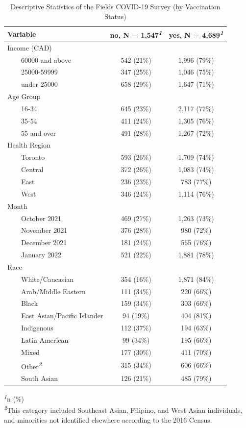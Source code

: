 \documentclass[
]{article}
\begin{document}
\hypertarget{tbl-descriptive-stats}{}
\setlength{\LTpost}{0mm}
\begin{longtable}{lcc}
\caption{\label{tbl-descriptive-stats}Descriptive Statistics of the Fields COVID-19 Survey (by Vaccination
Status) }\tabularnewline

\toprule
\textbf{Variable} & \textbf{no}, N = 1,547\textsuperscript{\textit{1}} & \textbf{yes}, N = 4,689\textsuperscript{\textit{1}} \\ 
\midrule
Income (CAD) &  &  \\ 
    60000 and above & 542 (21\%) & 1,996 (79\%) \\ 
    25000-59999 & 347 (25\%) & 1,046 (75\%) \\ 
    under 25000 & 658 (29\%) & 1,647 (71\%) \\ 
Age Group &  &  \\ 
    16-34 & 645 (23\%) & 2,117 (77\%) \\ 
    35-54 & 411 (24\%) & 1,305 (76\%) \\ 
    55 and over & 491 (28\%) & 1,267 (72\%) \\ 
Health Region &  &  \\ 
    Toronto & 593 (26\%) & 1,709 (74\%) \\ 
    Central & 372 (26\%) & 1,083 (74\%) \\ 
    East & 236 (23\%) & 783 (77\%) \\ 
    West & 346 (24\%) & 1,114 (76\%) \\ 
Month &  &  \\ 
    October 2021 & 469 (27\%) & 1,263 (73\%) \\ 
    November 2021 & 376 (28\%) & 980 (72\%) \\ 
    December 2021 & 181 (24\%) & 565 (76\%) \\ 
    January 2022 & 521 (22\%) & 1,881 (78\%) \\ 
Race &  &  \\ 
    White/Caucasian & 354 (16\%) & 1,871 (84\%) \\ 
    Arab/Middle Eastern & 111 (34\%) & 220 (66\%) \\ 
    Black & 159 (34\%) & 303 (66\%) \\ 
    East Asian/Pacific Islander & 94 (19\%) & 404 (81\%) \\ 
    Indigenous & 112 (37\%) & 194 (63\%) \\ 
    Latin American & 99 (34\%) & 195 (66\%) \\ 
    Mixed & 177 (30\%) & 411 (70\%) \\ 
    Other\textsuperscript{\textit{2}} & 315 (34\%) & 606 (66\%) \\ 
    South Asian & 126 (21\%) & 485 (79\%) \\ 
\bottomrule
\end{longtable}
\begin{minipage}{\linewidth}
\textsuperscript{\textit{1}}n (\%)\\
\textsuperscript{\textit{2}}This category included Southeast Asian, Filipino, and West Asian individuals,
and minorities not identified elsewhere according to the 2016 Census.\\
\end{minipage}
\end{document}
